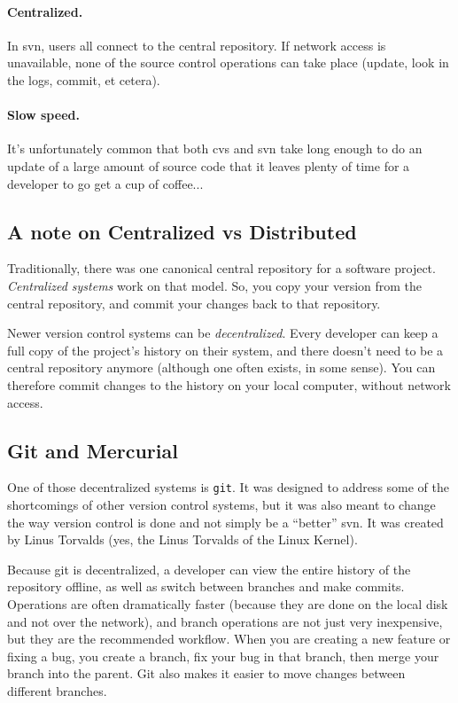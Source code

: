 \paragraph{Centralized.} In svn, users all connect to the central repository. If network access is unavailable, none of the source control operations can take place (update, look in the logs, commit, et cetera). 

\paragraph{Slow speed.} It's unfortunately common that both cvs and svn take long enough to do an update of a large amount of source code that it leaves plenty of time for a developer to go get a cup of coffee...

\subsection*{A note on Centralized vs Distributed}
Traditionally, there was one
canonical central repository for a software project.
\emph{Centralized systems} work on that model. So, you copy your
version from the central repository, and commit your changes back to
that repository.

Newer version control systems can be \emph{decentralized}. Every
developer can keep a full copy of the project's history on their
system, and there doesn't need to be a central repository anymore
(although one often exists, in some sense). You can therefore commit
changes to the history on your local computer, without network access.

\subsection*{Git and Mercurial}

One of those decentralized systems is \texttt{git}. It was designed to address some of the shortcomings of other version control systems, but it was also meant to change the way version control is done and not simply be a ``better'' svn. It was created by Linus Torvalds (yes, the Linus Torvalds of the Linux Kernel).

Because git is decentralized, a developer can view the entire history of the repository offline, as well as switch between branches and make commits. Operations are often dramatically faster (because they are done on the local disk and not over the network), and branch operations are not just very inexpensive, but they are the recommended workflow. When you are creating a new feature or fixing a bug, you create a branch, fix your bug in that branch, then merge your branch into the parent. Git also makes it easier to move changes between different branches.

